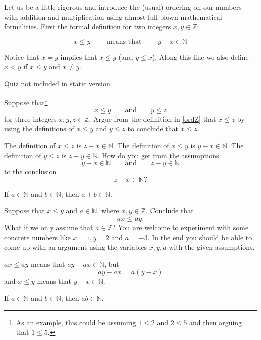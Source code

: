 Let us be a little rigorous and introduce the (usual) ordering
on our numbers with addition and multiplication using almost full blown
mathematical formalities. First the formal definition for two
integers $x, y\in \mathbb{Z}$:

\begin{tcolorbox}\begin{equation}\label{ordZ}
    x \leq y\qquad \text{ means that }\qquad y - x\in \mathbb{N}
  \end{equation}\end{tcolorbox}

Notice that $x = y$ implies that $x\leq y$ (and $y\leq x$).
Along this line we also define $x < y$ if $x \leq y$ and $x\neq y$.

\begin{quizexercise} Quiz not included in static version.\end{quizexercise}

\begin{exercise}
  Suppose that\footnote{As an example, this could be assuming $1 \leq 2$ and $2 \leq 5$ and then
    arguing that $1\leq 5$.}
  $$x \leq y\qquad\text{and}\qquad y\leq z
  $$
  for three integers $x, y, z\in \mathbb{Z}$. Argue
  from the definition in \eqref{ordZ} that $x\leq z$ by using the definitions of
  $x\leq y$ and $y\leq z$ to conclude that $x\leq z$.

  \begin{hint}
    The definition of $x\leq z$ is $z-x\in \mathbb{N}$. The definition of $x\leq y$ is
    $y - x\in \mathbb{N}$. The definition of $y\leq z$ is $z-y\in \mathbb{N}$. How do you get from
    the assumptions
    $$
      y - x\in \mathbb{N}\qquad\text{and}\qquad z - y\in \mathbb{N}
    $$
    to the conclusion
    $$
      z - x\in \mathbb{N}?
    $$
    \begin{hint}
      If $a\in \mathbb{N}$ and $b\in \mathbb{N}$, then $a + b\in \mathbb{N}$.
    \end{hint}
  \end{hint}
\end{exercise}

\begin{exercise}\label{multposordZ}
  Suppose that $x\leq y$ and $a\in \mathbb{N}$, where $x, y\in \mathbb{Z}$. Conclude that
  $$
    a x \leq a y.
  $$
  What if we only assume that $a\in \mathbb{Z}$? You are welcome to experiment with
  some concrete numbers like $x = 1, y = 2$ and $a = -3$. In the end
  you should be able to come up with an argument using the variables
  $x, y, a$ with the given assumptions.

  \begin{hint}
    $a x \leq a y$ means that $a y - a x \in \mathbb{N}$, but
    $$
      a y - a x = a ( y -  x)
    $$
    and $x \leq y$ means that $y - x\in \mathbb{N}$.

    \begin{hint}
      If $a\in \mathbb{N}$ and $b\in \mathbb{N}$, then $a b\in \mathbb{N}$.
    \end{hint}
  \end{hint}
\end{exercise}

